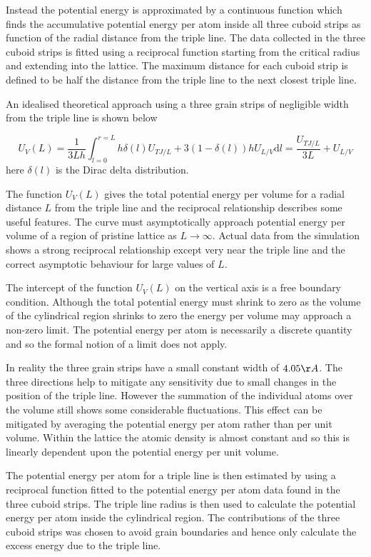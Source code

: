 \documentclass[12pt,a4paper]{book}
\begin{document}
Instead the potential energy is approximated by a continuous function which finds the accumulative potential energy per atom inside all three cuboid strips as function of the radial distance from the triple line. The data collected in the three cuboid strips is fitted using a reciprocal function starting from the critical radius and extending into the lattice. The maximum distance for each cuboid strip is defined to be half the distance from the triple line to the next closest triple line.


An idealised theoretical approach using a three grain strips of negligible width from the triple line is shown below 

\[ U_V(L) =\frac{1}{3 L h}\int_{l=0}^{r=L} h \delta(l) U_{TJ/L} + 3(1-\delta(l) ) h U_{L/V}  \text{d}l = \frac{U_{TJ/L}}{3L}  + U_{L/V} 
\label{eq:L1}
\]
here $\delta(l)$ is the Dirac delta distribution.

The function $U_V(L)$ gives the total potential energy per volume for a radial distance $L$ from the triple line and the reciprocal relationship describes some useful features. The curve must asymptotically approach potential energy per volume of a region of pristine lattice as $L \rightarrow \infty$. Actual data from the simulation shows a strong reciprocal relationship except very near the triple line and the correct asymptotic behaviour for large values of $L$. 

The intercept  of the function $U_V(L)$ on the vertical axis is a free boundary condition. Although the total potential energy must shrink to zero as the volume of the cylindrical region shrinks to zero the energy per volume may approach a non-zero limit. The potential energy per atom is necessarily a discrete quantity and so the formal notion of a limit does not apply. 

In reality the three grain strips have a small constant width of $4.05 \AA$. The three directions help to mitigate any sensitivity due to small changes in the position of the triple line. However the summation of the individual atoms over the volume still shows some considerable fluctuations. This effect can be mitigated by averaging the potential energy per atom rather than per unit volume. Within the lattice the atomic density is almost constant and so this is linearly dependent upon the potential energy per unit volume.  


The potential energy per atom for a triple line is then estimated by using a reciprocal function fitted to the potential energy per atom data found in the three cuboid strips. The triple line radius is then used to calculate the potential energy per atom inside the cylindrical region. The contributions of the three cuboid strips was chosen to avoid grain boundaries and hence only calculate the excess energy due to the triple line.  
\end{document}
